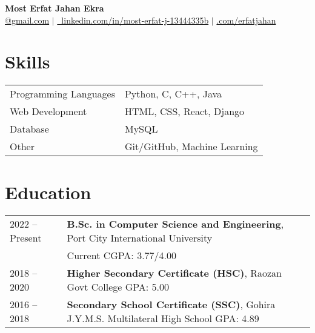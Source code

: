 \documentclass[a4paper,12pt]{article}
\begin{document}
\pagestyle{empty}

\begin{center}
{\Huge \textbf{Most Erfat Jahan Ekra}} \\[6pt]
\href{mailto:erfatjahan54@gmail.com}{\faEnvelope {}@gmail.com} $|$ \href{https://www.linkedin.com/in/most-erfat-j-13444335b}{\faLinkedin\ linkedin.com/in/most-erfat-j-13444335b} $|$
\href{https://github.com/erfatjahan}{\faGithub\github.com/erfatjahan}
\end{center}

\section{Skills}
\begin{tabularx}{\linewidth}{@{}l X@{}}
Programming Languages & Python, C, C++, Java \\
Web Development & HTML, CSS, React, Django \\
Database & MySQL \\
Other & Git/GitHub, Machine Learning \\
\end{tabularx}

\section{Education}
\begin{tabularx}{\linewidth}{@{}l X@{}}
2022 -- Present & \textbf{B.Sc. in Computer Science and Engineering}, Port City International University \\ 
                & Current CGPA: 3.77/4.00 \\
2018 -- 2020 & \textbf{Higher Secondary Certificate (HSC)}, Raozan Govt College \hfill GPA: 5.00 \\
2016 -- 2018 & \textbf{Secondary School Certificate (SSC)}, Gohira J.Y.M.S. Multilateral High School \hfill GPA: 4.89 \\
\end{tabularx}
\end{document}

